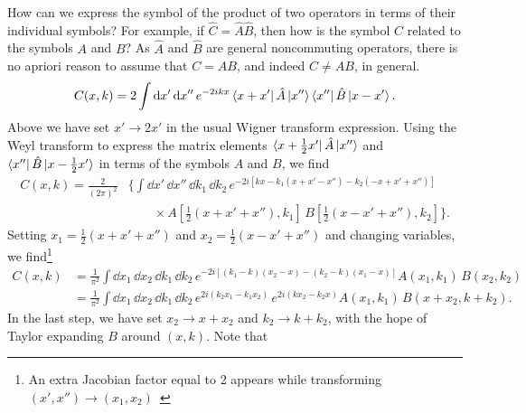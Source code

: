 How can we express the symbol of the product of two operators in terms of their individual symbols?
For example, if $\hat{C} = \hat{A}\hat{B}$, then how is the symbol $C$ related to the symbols $A$ and $B$?
As $\hat{A}$ and $\hat{B}$ are general noncommuting operators, there is no apriori reason to assume that $C = AB$, and indeed $C \neq AB$, in general.
%
\begin{equation}
  C(x, k) = 2\int \mathrm{d}{x'}\, \mathrm{d}{x''} \,e^{-2ikx} \mathinner{\langle{x + x'}\rvert}\hat{A}\mathinner{\lvert{x''}\rangle}\mathinner{\langle{x''}\rvert}\hat{B}\mathinner{\lvert{x - x'}\rangle}.
\end{equation}
%
Above we have set $x' \to 2x'$ in the usual Wigner transform expression.
Using the Weyl transform to express the matrix elements $\mathinner{\langle{x + \frac{1}{2}x'}\rvert}\hat{A}\mathinner{\lvert{x''}\rangle}$ and $\mathinner{\langle{x''}\rvert}\hat{B}\mathinner{\lvert{x - \frac{1}{2}x'}\rangle}$ in terms of the symbols $A$ and $B$, we find
%
\begin{equation}
  \begin{aligned}
    C(x, k) = \frac{2}{(2\pi)^{2}}& \bigg\{\int \dd{x'}\, \dd{x''}\, \dd{k_{1}}\, \dd{k_{2}}\,e^{-2i[kx - k_{1}(x + x' - x'') - k_{2}(-x + x' + x'')]}\\
                                           &\qquad\times A\left[\tfrac{1}{2}(x + x' + x''), k_{1}\right]\, B\left[\tfrac{1}{2}(x - x' + x''), k_{2}\right]\bigg\}.
  \end{aligned}
\end{equation}
%
Setting $x_{1} = \frac{1}{2}(x + x' + x'')$ and $x_{2} = \frac{1}{2}(x - x' + x'')$ and changing variables, we find\footnote{An extra Jacobian factor equal to 2 appears while transforming $(x', x'') \to (x_{1}, x_{2})$~\cite[Eq.~(2.3.23) and Problem~2.3.8]{chaichian2001}}
%
\begin{equation}
  \begin{aligned}
    C(x, k) &= \frac{1}{\pi^{2}} \int \dd{x_{1}}\, \dd{x_{2}}\, \dd{k_{1}}\, \dd{k_{2}}\,e^{-2i[(k_{1} - k)(x_{2} - x) - (k_{2} - k)(x_{1} - x)]} A(x_{1}, k_{1})\, B(x_{2}, k_{2})\\
                     &= \frac{1}{\pi^{2}} \int \dd{x_{1}}\, \dd{x_{2}}\, \dd{k_{1}}\, \dd{k_{2}}\,e^{2i(k_{2}x_{1} - k_{1}x_{2})}\,e^{2i(kx_{2} - k_{2}x)} A(x_{1}, k_{1})\, B(x + x_{2}, k + k_{2}).\label{eq:moyal1}
  \end{aligned}
\end{equation}
%
In the last step, we have set $x_{2} \to x + x_{2}$ and $k_{2} \to k + k_{2}$, with the hope of Taylor expanding $B$ around $(x, k)$.
Note that
%
